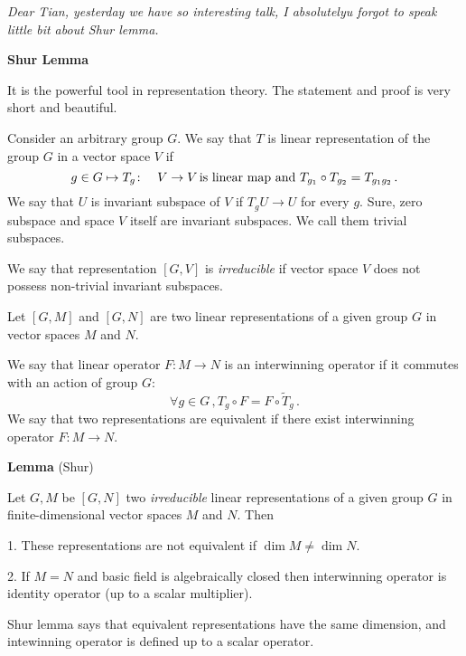 

\baselineskip=14pt

\def\l {\lambda}

       {\sl Dear Tian, yesterday we have  so interesting talk,
I absolutelyu forgot to speak little bit about Shur lemma.}

     \centerline {\bf Shur Lemma}
 
  It is the powerful tool in representation theory. The statement
and proof is very short and beautiful.

  Consider an arbitrary group $G$. We say
  that $T$ is linear representation of 
  the group $G$ in a vector space $V$ if
                     $$
  g\in G\mapsto T_g\colon\quad  V\to V \,\hbox {is linear map}\,\,
 {\rm and}\,\,     T_{g_1}\circ T_{g_2}=T_{g_1 g_2}\,.
                     $$
  We say that $U$ is invariant subspace of $V$
  if $T_g U\to U$ for every $g$.
   Sure, zero subspace and space $V$ itself are invariant subspaces.
  We call them trivial subspaces.

  We say that representation $[G,V]$ is {\it irreducible}
  if vector space $V$ does not possess non-trivial 
   invariant subspaces.
  
  Let $[G,M]$ and $[G,N]$ are two linear representations 
of a given group $G$ in vector spaces $M$ and $N$.

  We say that linear operator $F\colon M\to N$
is an interwinning operator if it commutes with an action
of group $G$:
                    $$
\forall g\in G\,, T_g\circ F=F\circ {\tilde T}_g\,. 
                    $$
   We say that two  representations are equivalent
   if there exist interwinning operator $F: M\to N$.


   

  {\bf Lemma} (Shur)
 
  Let ${G,M}$ be $[G,N]$ two {\it irreducible}
 linear representations  of a given group $G$ in finite-dimensional
vector spaces $M$ and $N$.  Then
  
1. These representations are not equivalent if  
$\dim M\not =\dim N$.   

2. If $M=N$ and basic field is algebraically closed
 then interwinning operator is identity operator
 (up to a scalar multiplier).

\medskip

   Shur lemma says that equivalent representations have the
same dimension, and intewinning operator is defined up to
a scalar operator.

\medskip


